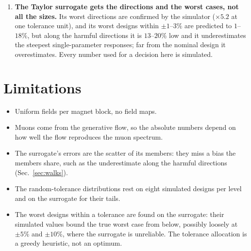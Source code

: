 \documentclass[11pt,a4paper]{article}
\begin{document}
\begin{enumerate}
        reverse direction raises the soft and high-momentum hits instead. The dominant
        active-subspace direction (the lengths and fields of M1--M4) trades hits between the
        groups and is harmful on both sides.
  \item \textbf{The Taylor surrogate gets the directions and the worst cases, not all the sizes.}
        Its worst directions are confirmed by the simulator ($\times5.2$ at one tolerance unit), and
        its worst designs within $\pm1$--$3\%$ are predicted to $1$--$18\%$, but along the harmful
        directions it is $13$--$20\%$ low and it underestimates the steepest single-parameter
        responses; far from the nominal design it overestimates. Every number used for a decision
        here is simulated.
\end{enumerate}

\section*{Limitations}
\begin{itemize}
  \item Uniform fields per magnet block, no field maps.
  \item Muons come from the generative flow, so the absolute numbers depend on how well the flow
        reproduces the muon spectrum.
  \item The surrogate's errors are the scatter of its members: they miss a bias the members
        share, such as the underestimate along the harmful directions (Sec.~\ref{sec:walks}).
  \item The random-tolerance distributions rest on eight simulated designs per level and on the
        surrogate for their tails.
  \item The worst designs within a tolerance are found on the surrogate: their simulated values
        bound the true worst case from below, possibly loosely at $\pm5\%$ and $\pm10\%$, where the
        surrogate is unreliable. The tolerance allocation is a greedy heuristic, not an optimum.
\end{itemize}

\clearpage
\appendix
\end{document}
